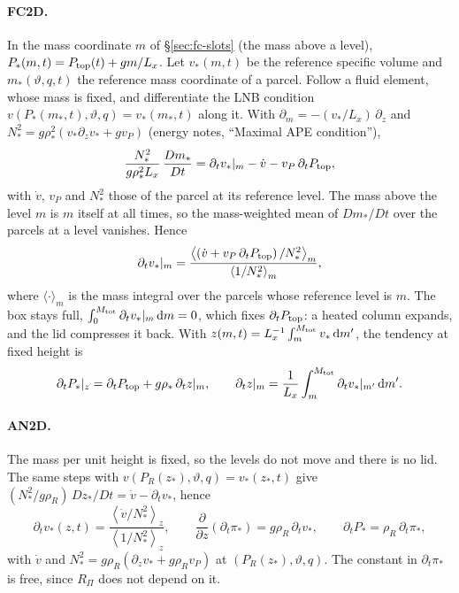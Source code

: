 \documentclass[11pt,a4paper]{article}
\newcommand{\vt}{\vartheta}
\newcommand{\Mtot}{M_{\rm tot}}
\newcommand{\Ptop}{P_{\rm top}}
\newcommand{\zs}{z_{*}}
\begin{document}
\paragraph{FC2D.} In the mass coordinate $m$ of \S\ref{sec:fc-slots} (the mass above a level), $P_*(m,t)=\Ptop(t)+gm/L_x$. Let $v_*(m,t)$ be the
reference specific volume and $m_*(\vt,q,t)$ the reference mass coordinate of a parcel. Follow a fluid element, whose mass is
fixed, and differentiate the LNB condition $v(P_*(m_*,t),\vt,q)=v_*(m_*,t)$ along it. With $\partial_m=-(v_*/L_x)\,\partial_z$
and $N_*^2=g\rho_*^2\left(v_*\partial_zv_*+gv_P\right)$ (energy notes, ``Maximal APE condition''),
\begin{equation}
  \frac{N_*^2}{g\rho_*^2L_x}\,\frac{Dm_*}{Dt}=\partial_tv_*|_m-\dot v-v_P\,\partial_t\Ptop ,
\end{equation}
with $\dot v$, $v_P$ and $N_*^2$ those of the parcel at its reference level. The mass above the level $m$ is $m$ itself at all
times, so the mass-weighted mean of $Dm_*/Dt$ over the parcels at a level vanishes. Hence
\begin{equation}
  \partial_tv_*|_m=\frac{\left\langle\left(\dot v+v_P\,\partial_t\Ptop\right)/N_*^2\right\rangle_m}
                          {\left\langle1/N_*^2\right\rangle_m},
  \label{eq:dtvstar}
\end{equation}
where $\langle\cdot\rangle_m$ is the mass integral over the parcels whose reference level is $m$. The box stays full,
$\int_0^{\Mtot}\partial_tv_*|_m\,\mathrm{d}m=0$, which fixes $\partial_t\Ptop$: a heated column expands, and the lid compresses
it back. With $z(m,t)=L_x^{-1}\int_m^{\Mtot}v_*\,\mathrm{d}m'$, the tendency at fixed height is
\begin{equation}
  \partial_tP_*|_z=\partial_t\Ptop+g\rho_*\,\partial_tz|_m,\qquad
  \partial_tz|_m=\frac1{L_x}\int_m^{\Mtot}\partial_tv_*|_{m'}\,\mathrm{d}m' .
  \label{eq:dtPz}
\end{equation}

\paragraph{AN2D.} The mass per unit height is fixed, so the levels do not move and there is no lid. The same steps with
$v(P_R(\zs),\vt,q)=v_*(\zs,t)$ give $(N_*^2/g\rho_R)\,D\zs/Dt=\dot v-\partial_tv_*$, hence
\begin{equation}
  \partial_tv_*(z,t)=\frac{\left\langle\dot v/N_*^2\right\rangle_z}{\left\langle1/N_*^2\right\rangle_z},\qquad
  \frac{\partial}{\partial z}\left(\partial_t\pi_*\right)=g\rho_R\,\partial_tv_*,\qquad \partial_tP_*=\rho_R\,\partial_t\pi_*,
  \label{eq:dtvstar-an}
\end{equation}
with $\dot v$ and $N_*^2=g\rho_R\left(\partial_zv_*+g\rho_Rv_P\right)$ at $(P_R(\zs),\vt,q)$. The constant in $\partial_t\pi_*$ is
free, since $R_\Pi$ does not depend on it.
\end{document}
